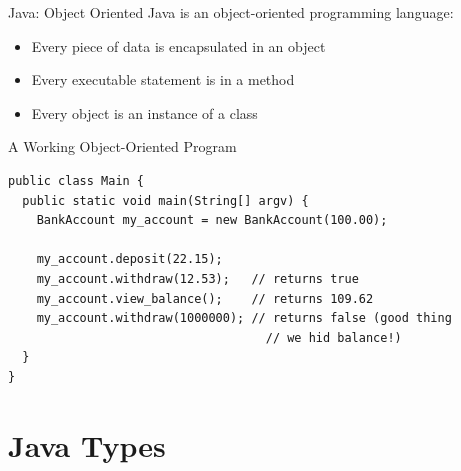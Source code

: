 \documentclass[aspectratio=169]{beamer}
\begin{document}
\begin{frame}{Java: Object Oriented}
Java is an object-oriented programming language: \\
\begin{itemize}
\item Every piece of data is encapsulated in an object
\item Every executable statement is in a method
\item Every object is an instance of a class
\end{itemize}
\end{frame}



\begin{frame}[fragile]{A Working Object-Oriented Program}
\centering
\begin{Verbatim}
public class Main {
  public static void main(String[] argv) {
    BankAccount my_account = new BankAccount(100.00);
      
    my_account.deposit(22.15);
    my_account.withdraw(12.53);   // returns true
    my_account.view_balance();    // returns 109.62
    my_account.withdraw(1000000); // returns false (good thing 
                                    // we hid balance!)
  }
}
\end{Verbatim}
\end{frame}



\section{Java Types}
\end{document}

